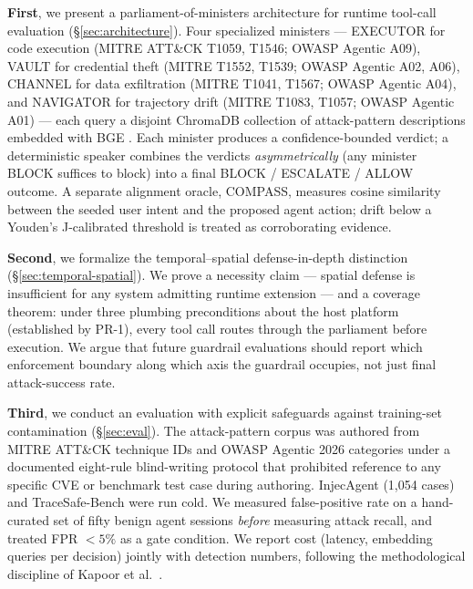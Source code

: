 \textbf{First}, we present a parliament-of-ministers architecture for runtime
tool-call evaluation (\S\ref{sec:architecture}). Four specialized ministers ---
EXECUTOR for code execution (MITRE ATT\&CK T1059, T1546; OWASP Agentic A09),
VAULT for credential theft (MITRE T1552, T1539; OWASP Agentic A02, A06),
CHANNEL for data exfiltration (MITRE T1041, T1567; OWASP Agentic A04), and
NAVIGATOR for trajectory drift (MITRE T1083, T1057; OWASP Agentic A01) ---
each query a disjoint ChromaDB collection of attack-pattern descriptions embedded
with BGE \cite{xiao2024bge}. Each minister produces a confidence-bounded verdict;
a deterministic speaker combines the verdicts \emph{asymmetrically} (any minister
BLOCK suffices to block) into a final BLOCK / ESCALATE / ALLOW outcome. A
separate alignment oracle, COMPASS, measures cosine similarity between the
seeded user intent and the proposed agent action; drift below a Youden's
J-calibrated threshold is treated as corroborating evidence.

\textbf{Second}, we formalize the temporal--spatial defense-in-depth distinction
(\S\ref{sec:temporal-spatial}). We prove a necessity claim --- spatial defense is
insufficient for any system admitting runtime extension --- and a coverage theorem:
under three plumbing preconditions about the host platform (established by PR-1),
every tool call routes through the parliament before execution. We argue that
future guardrail evaluations should report which enforcement boundary along which
axis the guardrail occupies, not just final attack-success rate.

\textbf{Third}, we conduct an evaluation with explicit safeguards against
training-set contamination (\S\ref{sec:eval}). The attack-pattern corpus was
authored from MITRE ATT\&CK technique IDs and OWASP Agentic 2026 categories
under a documented eight-rule blind-writing protocol that prohibited reference
to any specific CVE or benchmark test case during authoring. InjecAgent
\cite{zhan2024injecagent} (1,054 cases) and TraceSafe-Bench
\cite{tracesafe2026} were run cold. We measured false-positive rate on a
hand-curated set of fifty benign agent sessions \emph{before} measuring attack
recall, and treated FPR ${<}5\%$ as a gate condition. We report cost (latency,
embedding queries per decision) jointly with detection numbers, following the
methodological discipline of Kapoor et al.~\cite{kapoor2024aiagents}.


